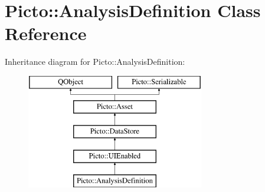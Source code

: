 \hypertarget{class_picto_1_1_analysis_definition}{\section{Picto\-:\-:Analysis\-Definition Class Reference}
\label{class_picto_1_1_analysis_definition}
}
Inheritance diagram for Picto\-:\-:Analysis\-Definition\-:\begin{figure}[H]
\begin{center}
\leavevmode
\includegraphics[height=5.000000cm]{class_picto_1_1_analysis_definition}
\end{center}
\end{figure}
